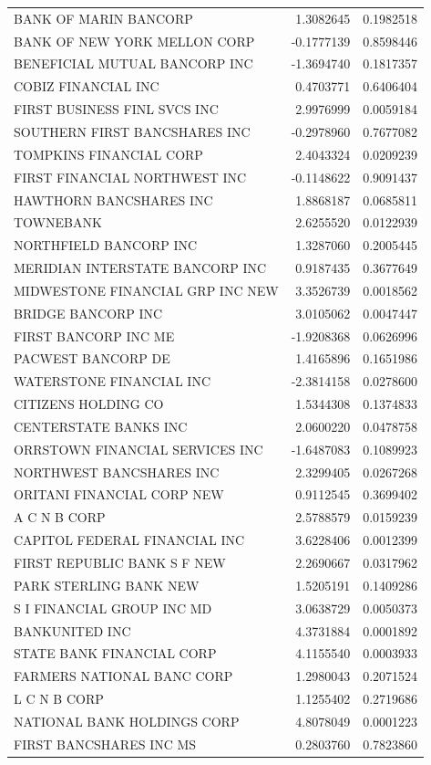 \documentclass[11pt,]{article}
\begin{document}
\begin{longtable}[]{@{}lrr@{}}
BANK OF MARIN BANCORP & 1.3082645 & 0.1982518\tabularnewline
BANK OF NEW YORK MELLON CORP & -0.1777139 & 0.8598446\tabularnewline
BENEFICIAL MUTUAL BANCORP INC & -1.3694740 & 0.1817357\tabularnewline
COBIZ FINANCIAL INC & 0.4703771 & 0.6406404\tabularnewline
FIRST BUSINESS FINL SVCS INC & 2.9976999 & 0.0059184\tabularnewline
SOUTHERN FIRST BANCSHARES INC & -0.2978960 & 0.7677082\tabularnewline
TOMPKINS FINANCIAL CORP & 2.4043324 & 0.0209239\tabularnewline
FIRST FINANCIAL NORTHWEST INC & -0.1148622 & 0.9091437\tabularnewline
HAWTHORN BANCSHARES INC & 1.8868187 & 0.0685811\tabularnewline
TOWNEBANK & 2.6255520 & 0.0122939\tabularnewline
NORTHFIELD BANCORP INC & 1.3287060 & 0.2005445\tabularnewline
MERIDIAN INTERSTATE BANCORP INC & 0.9187435 & 0.3677649\tabularnewline
MIDWESTONE FINANCIAL GRP INC NEW & 3.3526739 & 0.0018562\tabularnewline
BRIDGE BANCORP INC & 3.0105062 & 0.0047447\tabularnewline
FIRST BANCORP INC ME & -1.9208368 & 0.0626996\tabularnewline
PACWEST BANCORP DE & 1.4165896 & 0.1651986\tabularnewline
WATERSTONE FINANCIAL INC & -2.3814158 & 0.0278600\tabularnewline
CITIZENS HOLDING CO & 1.5344308 & 0.1374833\tabularnewline
CENTERSTATE BANKS INC & 2.0600220 & 0.0478758\tabularnewline
ORRSTOWN FINANCIAL SERVICES INC & -1.6487083 & 0.1089923\tabularnewline
NORTHWEST BANCSHARES INC & 2.3299405 & 0.0267268\tabularnewline
ORITANI FINANCIAL CORP NEW & 0.9112545 & 0.3699402\tabularnewline
A C N B CORP & 2.5788579 & 0.0159239\tabularnewline
CAPITOL FEDERAL FINANCIAL INC & 3.6228406 & 0.0012399\tabularnewline
FIRST REPUBLIC BANK S F NEW & 2.2690667 & 0.0317962\tabularnewline
PARK STERLING BANK NEW & 1.5205191 & 0.1409286\tabularnewline
S I FINANCIAL GROUP INC MD & 3.0638729 & 0.0050373\tabularnewline
BANKUNITED INC & 4.3731884 & 0.0001892\tabularnewline
STATE BANK FINANCIAL CORP & 4.1155540 & 0.0003933\tabularnewline
FARMERS NATIONAL BANC CORP & 1.2980043 & 0.2071524\tabularnewline
L C N B CORP & 1.1255402 & 0.2719686\tabularnewline
NATIONAL BANK HOLDINGS CORP & 4.8078049 & 0.0001223\tabularnewline
FIRST BANCSHARES INC MS & 0.2803760 & 0.7823860\tabularnewline
\bottomrule
\end{longtable}
\end{document}
